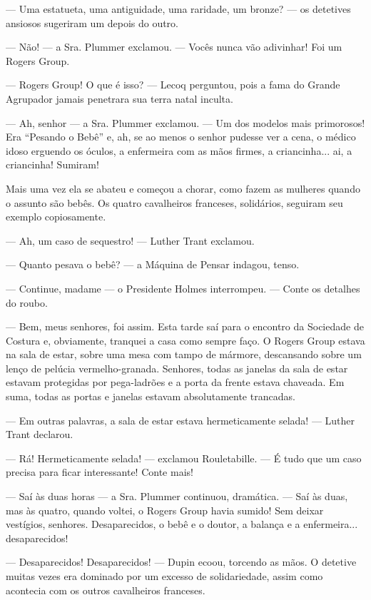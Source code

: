 --- Uma estatueta, uma antiguidade, uma raridade, um bronze? --- os
detetives ansiosos sugeriram um depois do outro.

--- Não! --- a Sra. Plummer exclamou. --- Vocês nunca vão adivinhar! Foi
um Rogers Group.

--- Rogers Group! O que é isso? --- Lecoq perguntou, pois a fama do
Grande Agrupador jamais penetrara sua terra natal inculta.

--- Ah, senhor --- a Sra. Plummer exclamou. --- Um dos modelos mais
primorosos! Era ``Pesando o Bebê'' e, ah, se ao menos o senhor pudesse
ver a cena, o médico idoso erguendo os óculos, a enfermeira com as mãos
firmes, a criancinha... ai, a criancinha! Sumiram!

Mais uma vez ela se abateu e começou a chorar, como fazem as mulheres
quando o assunto são bebês. Os quatro cavalheiros franceses, solidários,
seguiram seu exemplo copiosamente.

--- Ah, um caso de sequestro! --- Luther Trant exclamou.

--- Quanto pesava o bebê? --- a Máquina de Pensar indagou, tenso.

--- Continue, madame --- o Presidente Holmes interrompeu. --- Conte os
detalhes do roubo.

--- Bem, meus senhores, foi assim. Esta tarde saí para o encontro da
Sociedade de Costura e, obviamente, tranquei a casa como sempre faço. O
Rogers Group estava na sala de estar, sobre uma mesa com tampo de
mármore, descansando sobre um lenço de pelúcia vermelho-granada.
Senhores, todas as janelas da sala de estar estavam protegidas por
pega-ladrões e a porta da frente estava chaveada. Em suma, todas as
portas e janelas estavam absolutamente trancadas.

--- Em outras palavras, a sala de estar estava hermeticamente selada!
--- Luther Trant declarou.

--- Rá! Hermeticamente selada! --- exclamou Rouletabille. --- É tudo que
um caso precisa para ficar interessante! Conte mais!

--- Saí às duas horas --- a Sra. Plummer continuou, dramática. --- Saí
às duas, mas às quatro, quando voltei, o Rogers Group havia sumido! Sem
deixar vestígios, senhores. Desaparecidos, o bebê e o doutor, a balança
e a enfermeira... desaparecidos!

--- Desaparecidos! Desaparecidos! --- Dupin ecoou, torcendo as mãos. O
detetive muitas vezes era dominado por um excesso de solidariedade,
assim como acontecia com os outros cavalheiros franceses.

